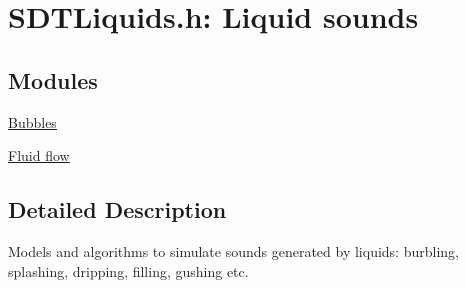 \hypertarget{group__liquids}{}\section{S\+D\+T\+Liquids.\+h\+: Liquid sounds}
\label{group__liquids}
\subsection*{Modules}
\begin{DoxyCompactItemize}
\item 
\hyperlink{group__bubbles}{Bubbles}
\item 
\hyperlink{group__fluidflow}{Fluid flow}
\end{DoxyCompactItemize}


\subsection{Detailed Description}
Models and algorithms to simulate sounds generated by liquids\+: burbling, splashing, dripping, filling, gushing etc. 